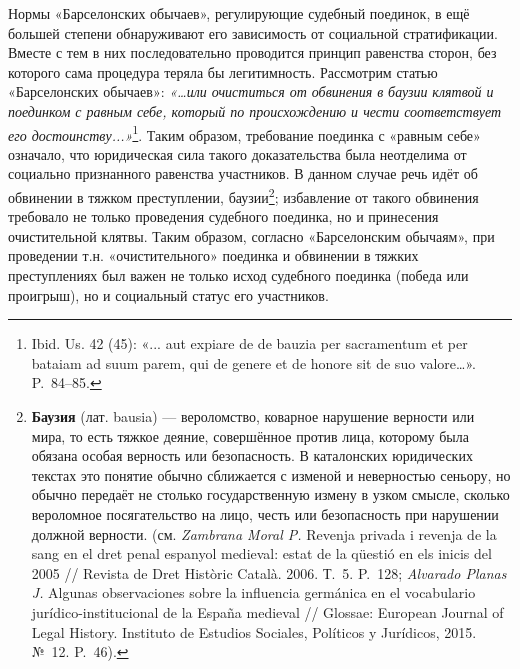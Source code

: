 Нормы «Барселонских обычаев», регулирующие судебный поединок, в ещё большей степени обнаруживают его зависимость от социальной стратификации. Вместе с тем в них последовательно проводится принцип равенства сторон, без которого сама процедура теряла бы легитимность. Рассмотрим статью «Барселонских обычаев»: \emph{«…или очиститься от обвинения в }\emph{баузии}\emph{ клятвой и поединком с равным себе, который по происхождению и чести соответствует его достоинству...»}\footnote{Ibid. Us. 42 (45): «... aut expiare de de bauzia per sacramentum et per bataiam ad suum parem, qui de genere et de honore sit de suo valore…». P.~84--85.}. Таким образом, требование поединка с «равным себе» означало, что юридическая сила такого доказательства была неотделима от социально признанного равенства участников. В данном случае речь идёт об обвинении в тяжком преступлении, баузии\footnote{\textbf{Баузия} (лат. bausia) --- вероломство, коварное нарушение верности или мира, то есть тяжкое деяние, совершённое против лица, которому была обязана особая верность или безопасность. В каталонских юридических текстах это понятие обычно сближается с изменой и неверностью сеньору, но обычно передаёт не столько государственную измену в узком смысле, сколько вероломное посягательство на лицо, честь или безопасность при нарушении должной верности. (см. \emph{Zambrana Moral P.} Revenja privada i revenja de la sang en el dret penal espanyol medieval: estat de la qüestió en els inicis del 2005 // Revista de Dret Històric Català. 2006. Т.~5. P.~128; \emph{Alvarado Planas J. }Algunas observaciones sobre la influencia germánica en el vocabulario jurídico-institucional de la España medieval // Glossae: European Journal of Legal History. Instituto de Estudios Sociales, Políticos y Jurídicos, 2015. №~12. P.~46).}; избавление от такого обвинения требовало не только проведения судебного поединка, но и принесения очистительной клятвы. Таким образом, согласно «Барселонским обычаям», при проведении т.н. «очистительного» поединка и обвинении в тяжких преступлениях был важен не только исход судебного поединка (победа или проигрыш), но и социальный статус его участников.

